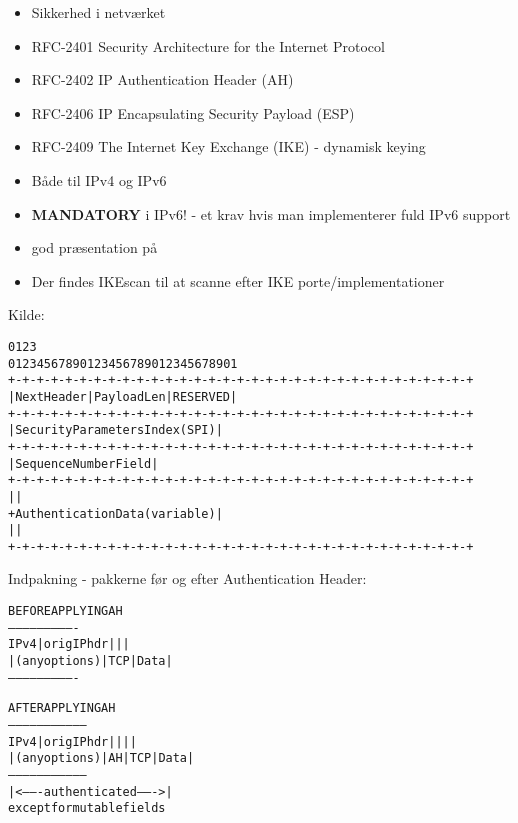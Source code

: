 \documentclass[Screen16to9,17pt]{foils}
\begin{document}
\begin{itemize}
\item Sikkerhed i netværket
\item RFC-2401 Security Architecture for the Internet Protocol
\item RFC-2402 IP Authentication Header (AH)
\item RFC-2406 IP Encapsulating Security Payload (ESP)
\item RFC-2409 The Internet Key Exchange (IKE) - dynamisk keying
\item Både til IPv4 og IPv6
\item {\bfseries MANDATORY} i IPv6! - et krav hvis man implementerer
  fuld IPv6 support
\item god præsentation på 
\item Der findes IKEscan til at scanne efter IKE
  porte/implementationer\\
\end{itemize}


\centerline{Kilde: }



\begin{alltt}
\small
    0                   1                   2                   3
    0 1 2 3 4 5 6 7 8 9 0 1 2 3 4 5 6 7 8 9 0 1 2 3 4 5 6 7 8 9 0 1
   +-+-+-+-+-+-+-+-+-+-+-+-+-+-+-+-+-+-+-+-+-+-+-+-+-+-+-+-+-+-+-+-+
   | Next Header   |  Payload Len  |          RESERVED             |
   +-+-+-+-+-+-+-+-+-+-+-+-+-+-+-+-+-+-+-+-+-+-+-+-+-+-+-+-+-+-+-+-+
   |                 Security Parameters Index (SPI)               |
   +-+-+-+-+-+-+-+-+-+-+-+-+-+-+-+-+-+-+-+-+-+-+-+-+-+-+-+-+-+-+-+-+
   |                    Sequence Number Field                      |
   +-+-+-+-+-+-+-+-+-+-+-+-+-+-+-+-+-+-+-+-+-+-+-+-+-+-+-+-+-+-+-+-+
   |                                                               |
   +                Authentication Data (variable)                 |
   |                                                               |
   +-+-+-+-+-+-+-+-+-+-+-+-+-+-+-+-+-+-+-+-+-+-+-+-+-+-+-+-+-+-+-+-+
\end{alltt}


Indpakning - pakkerne før og efter Authentication Header:
\begin{alltt}
\small
                BEFORE APPLYING AH
            ----------------------------
      IPv4  |orig IP hdr  |     |      |
            |(any options)| TCP | Data |
            ----------------------------

                  AFTER APPLYING AH
            ---------------------------------
      IPv4  |orig IP hdr  |    |     |      |
            |(any options)| AH | TCP | Data |
            ---------------------------------
            |<------- authenticated ------->|
                 except for mutable fields
\end{alltt}
\end{document}
